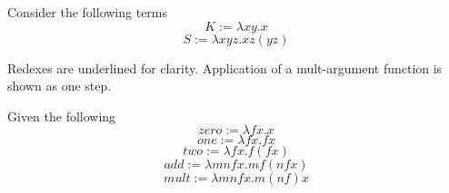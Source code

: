 \documentclass[12pt]{exam}
\begin{document}
\begin{questions}
\question 
Consider the following terms 
\[K:=\lambda xy. x\]
\[S:=\lambda xyz. xz(yz)\]

\begin{solution}
Redexes are underlined for clarity. Application of a mult-argument function is shown as one step. 
\end{solution}
\question Given the following
\[zero:=\lambda fx. x\]
\[one:=\lambda fx. f x\]
\[two:=\lambda fx. f (f x)\]
\[add:=\lambda mnfx. m f (n f x)\]
\[mult:=\lambda mnfx. m (n f) x\]
\begin{solution}
\begin{parts}
\part
\[\underline{\mathit{add} \mathit{one} \mathit{one}} \twoheadrightarrow_\beta \lambda fx. \underline{\mathit{one} f (\mathit{one} f x)} \twoheadrightarrow_\beta \lambda fx. f \underline{(\mathit{one} f x)} \twoheadrightarrow_\beta \lambda fx. f (f x) = \mathit{two} \]


\end{parts}
\end{solution}
\end{questions}
\end{document}
